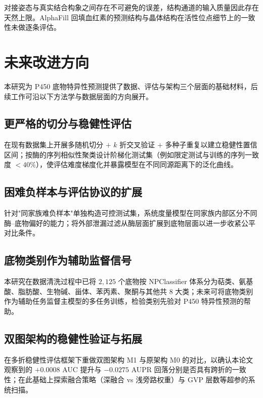 对接姿态与真实结合构象之间存在不可避免的误差，结构通道的输入质量因此存在天然上限。AlphaFill 回填血红素的预测结构与晶体结构在活性位点细节上的一致性未做逐条评估。

\section{未来改进方向}
\label{sec:future-work}

本研究为 P450 底物特异性预测提供了数据、评估与架构三个层面的基础材料，后续工作可沿以下方法学与数据层面的方向展开。

\subsection{更严格的切分与稳健性评估}
\label{subsec:future-split}

在现有数据集上开展多随机切分 $+$ $k$ 折交叉验证 $+$ 多种子重复以建立稳健性置信区间；按酶的序列相似性聚类设计阶梯化测试集（例如限定测试与训练的序列一致度 $<40\%$），使评估难度梯度化并暴露模型在不同同源距离下的泛化曲线。

\subsection{困难负样本与评估协议的扩展}
\label{subsec:future-neg}

针对"同家族难负样本"单独构造可控测试集，系统度量模型在同家族内部区分不同酶--底物偏好的能力；将外部泄漏过滤从酶层面扩展到底物层面以进一步收紧公平对比条件。

\subsection{底物类别作为辅助监督信号}
\label{subsec:future-class}

本研究在数据清洗过程中已将 $2{,}125$ 个底物按 NPClassifier\cite{NPClassifier2021} 体系分为萜类、氨基酸、脂肪酸、生物碱、甾体、苯丙素、聚酮与其他共 $8$ 大类；未来可将底物类别作为辅助任务监督主模型的多任务训练，检验类别先验对 P450 特异性预测的帮助。

\subsection{双图架构的稳健性验证与拓展}
\label{subsec:future-arch}

在多折稳健性评估框架下重做双图架构 M1 与原架构 M0 的对比，以确认本论文观察到的 $+0.0008$ AUC 提升与 $-0.0275$ AUPR 回落分别是否具有跨折的一致性；在此基础上探索融合策略（深融合 vs 浅旁路权重）与 GVP 层数等超参的系统扫描。

